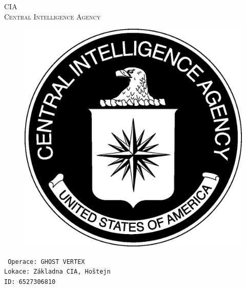 \documentclass[a4paper, \fontheight]{article}
\begin{document}
	\begin{titlepage}
		\begin{center}		
			\textsc{{\fontsize{80}{0}\selectfont CIA}\\[2em]
				\Huge Central Intelligence Agency\\[2.5em]}
				
			\begin{figure}[H]
				\centering
				\includegraphics[scale=0.6]{sources/CIA_logo.eps}
			\end{figure}
		\end{center}	
		\vfill
		\noindent
		\texttt{\LARGE
				Operace: GHOST VERTEX\\[0.4em]
				Lokace: Základna CIA, Hoštejn\\[0.4em]
				ID: 6527306810}	
\end{titlepage} 
\end{document}
